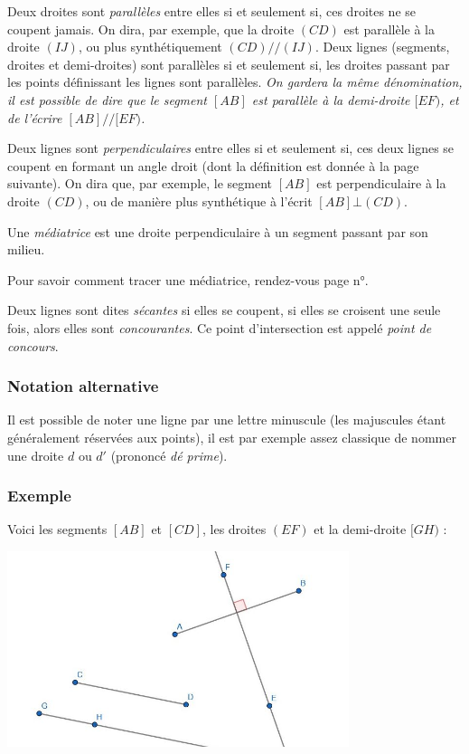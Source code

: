 \documentclass[a4paper, twoside]{article}
\begin{document}
Deux droites sont \emph{parallèles} entre elles si et seulement si, ces droites ne se coupent jamais.
On dira, par exemple, que la droite $(CD)$ est parallèle à la droite $(IJ)$, ou plus synthétiquement $(CD)//(IJ)$.
Deux lignes (segments, droites et demi-droites) sont parallèles si et seulement si,
les droites passant par les points définissant les lignes sont parallèles.
\textit{On gardera la même dénomination, il est possible de dire que le segment $[AB]$ est parallèle à
la demi-droite $[EF)$, et de l'écrire $[AB] // [EF)$.}

\medbreak

Deux lignes sont \emph{perpendiculaires} entre elles si et seulement si, ces deux lignes se coupent
en formant un angle droit (dont la définition est donnée à la page suivante).
On dira que, par exemple, le segment $[AB]$ est perpendiculaire à la droite $(CD)$,
ou de manière plus synthétique à l'écrit $[AB] \bot (CD)$.

\medbreak

Une \emph{médiatrice} est une droite perpendiculaire à un segment passant par son milieu.

Pour savoir comment tracer une médiatrice, rendez-vous page n°\pageref{tracer_mediatrice_bissectrice}.

\medbreak

Deux lignes sont dites \emph{sécantes} si elles se coupent,
si elles se croisent une seule fois, alors elles sont \emph{concourantes}.
Ce point d'intersection est appelé \emph{point de concours}.

\subsubsection*{Notation alternative}

Il est possible de noter une ligne par une lettre minuscule (les majuscules étant
généralement réservées aux points), il est par exemple assez classique de nommer une
droite $d$ ou $d'$ (prononcé \textit{dé prime}).


\subsubsection*{Exemple}

Voici les segments $[AB]$ et $[CD]$, les droites $(EF)$ et la demi-droite $[GH)$ :

\begin{center}
	\includegraphics[width=10cm]{Image/Exemple segment droite.jpg}
\end{center}
\end{document}
